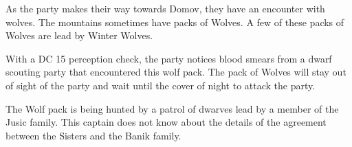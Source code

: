 As the party makes their way towards Domov, they have an encounter with wolves.
The mountains sometimes have packs of Wolves.
A few of these packs of Wolves are lead by Winter Wolves.

With a DC 15 perception check, the party notices blood smears from a dwarf scouting party that encountered this wolf pack.
The pack of Wolves will stay out of sight of the party and wait until the cover of night to attack the party.

The Wolf pack is being hunted by a patrol of dwarves lead by a member of the Jusic family.
This captain does not know about the details of the agreement between the Sisters and the Banik family.
